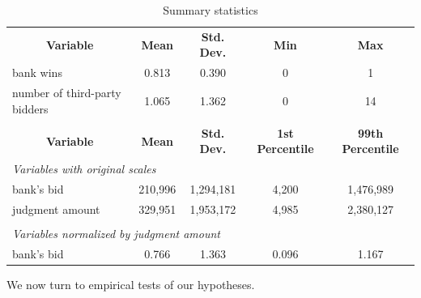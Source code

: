 \documentclass[11pt,twopage]{article}
\begin{document}
\begin{table}[!htbp]
  \centering \caption{Summary statistics \label{sumstat}}
  \begin{tabular}{lcccc}
    &&&&\\
    \hline
    \multicolumn{1}{c}{\textbf{Variable}}&\textbf{Mean}  & \textbf{Std. Dev.} 
    & \textbf{Min}& \textbf{Max} \tabularnewline
    \hline
    bank wins & 0.813 & 0.390 & 0 & 1 \\
    number of third-party bidders & 1.065 & 1.362 & 0 & 14 \\


    &&&&\\
    \hline
    \multicolumn{1}{c}{\textbf{Variable}}&\textbf{Mean}  & \textbf{Std. Dev.} 
    & \textbf{1st Percentile}& \textbf{99th Percentile} \tabularnewline
    \hline
    \multicolumn{3}{l}{\textit{Variables with original scales}}&&\\

    bank's bid & 210,996 & 1,294,181 & 4,200 & 1,476,989 \\
    judgment amount & 329,951 & 1,953,172 & 4,985 & 2,380,127 \\

    &&&&\\
    \multicolumn{3}{l}{\textit{Variables normalized by judgment amount}}&&\\

    bank's bid & 0.766 & 1.363 & 0.096 & 1.167 \\
    \hline
  \end{tabular}
\end{table}

We now turn to empirical tests of our hypotheses.
\end{document}
